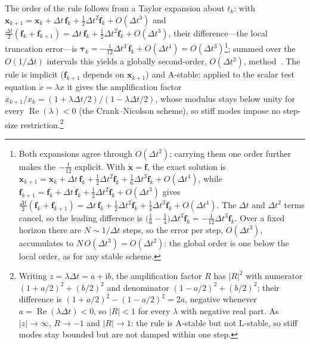 \documentclass[../main.tex]{subfiles}
\begin{document}
The order of the rule follows from a Taylor expansion about $t_k$: with $\mathbf{x}_{k+1} = \mathbf{x}_k + \Delta t\,\mathbf{f}_k + \tfrac{1}{2}\Delta t^2\dot{\mathbf{f}}_k + O(\Delta t^3)$ and $\tfrac{\Delta t}{2}(\mathbf{f}_k + \mathbf{f}_{k+1}) = \Delta t\,\mathbf{f}_k + \tfrac{1}{2}\Delta t^2\dot{\mathbf{f}}_k + O(\Delta t^3)$, their difference---the local truncation error---is $\boldsymbol{\tau}_k = -\tfrac{1}{12}\Delta t^3\,\ddot{\mathbf{f}}_k + O(\Delta t^4) = O(\Delta t^3)$\footnote{Both expansions agree through $O(\Delta t^2)$; carrying them one order further makes the $-\tfrac{1}{12}$ explicit. With $\dot{\mathbf{x}} = \mathbf{f}$, the exact solution is $\mathbf{x}_{k+1} = \mathbf{x}_k + \Delta t\,\mathbf{f}_k + \tfrac{1}{2}\Delta t^2\dot{\mathbf{f}}_k + \tfrac{1}{6}\Delta t^3\ddot{\mathbf{f}}_k + O(\Delta t^4)$, while $\mathbf{f}_{k+1} = \mathbf{f}_k + \Delta t\,\dot{\mathbf{f}}_k + \tfrac{1}{2}\Delta t^2\ddot{\mathbf{f}}_k + O(\Delta t^3)$ gives $\tfrac{\Delta t}{2}(\mathbf{f}_k + \mathbf{f}_{k+1}) = \Delta t\,\mathbf{f}_k + \tfrac{1}{2}\Delta t^2\dot{\mathbf{f}}_k + \tfrac{1}{4}\Delta t^3\ddot{\mathbf{f}}_k + O(\Delta t^4)$. The $\Delta t$ and $\Delta t^2$ terms cancel, so the leading difference is $\bigl(\tfrac{1}{6} - \tfrac{1}{4}\bigr)\Delta t^3\ddot{\mathbf{f}}_k = -\tfrac{1}{12}\Delta t^3\ddot{\mathbf{f}}_k$. Over a fixed horizon there are $N \sim 1/\Delta t$ steps, so the error per step, $O(\Delta t^3)$, accumulates to $N\,O(\Delta t^3) = O(\Delta t^2)$: the global order is one below the local order, as for any stable scheme.}; summed over the $O(1/\Delta t)$ intervals this yields a globally second-order, $O(\Delta t^2)$, method~\cite[Eq.~(4.56) and p.~133]{betts2010}. The rule is implicit ($\mathbf{f}_{k+1}$ depends on $\mathbf{x}_{k+1}$) and A-stable: applied to the scalar test equation $\dot{x} = \lambda x$ it gives the amplification factor $x_{k+1}/x_k = (1 + \lambda\Delta t/2)/(1 - \lambda\Delta t/2)$, whose modulus stays below unity for every $\operatorname{Re}(\lambda) < 0$ (the Crank--Nicolson scheme), so stiff modes impose no step-size restriction.\footnote{Writing $z = \lambda\Delta t = a + \mathrm{i}b$, the amplification factor $R$ has $|R|^2$ with numerator $(1+a/2)^2 + (b/2)^2$ and denominator $(1-a/2)^2 + (b/2)^2$; their difference is $(1+a/2)^2 - (1-a/2)^2 = 2a$, negative whenever $a = \operatorname{Re}(\lambda\Delta t) < 0$, so $|R| < 1$ for every $\lambda$ with negative real part. As $|z| \to \infty$, $R \to -1$ and $|R| \to 1$: the rule is A-stable but not L-stable, so stiff modes stay bounded but are not damped within one step.}
\end{document}
